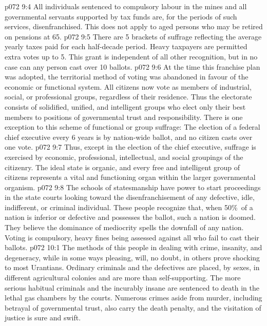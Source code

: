 \vs p072 9:4 \bibnobreakspace All individuals sentenced to compulsory labour in the mines and all governmental servants supported by tax funds are, for the periods of such services, disenfranchised. This does not apply to aged persons who may be retired on pensions at 65.
\vs p072 9:5 \bibnobreakspace There are 5 brackets of suffrage reflecting the average yearly taxes paid for each half\hyp{}decade period. Heavy taxpayers are permitted extra votes up to 5. This grant is independent of all other recognition, but in no case can any person cast over 10 ballots.
\vs p072 9:6 \bibnobreakspace At the time this franchise plan was adopted, the territorial method of voting was abandoned in favour of the economic or functional system. All citizens now vote as members of industrial, social, or professional groups, regardless of their residence. Thus the electorate consists of solidified, unified, and intelligent groups who elect only their best members to positions of governmental trust and responsibility. There is one exception to this scheme of functional or group suffrage: The election of a federal chief executive every 6 years is by nation\hyp{}wide ballot, and no citizen casts over one vote.
\vs p072 9:7 \pc Thus, except in the election of the chief executive, suffrage is exercised by economic, professional, intellectual, and social groupings of the citizenry. The ideal state is organic, and every free and intelligent group of citizens represents a vital and functioning organ within the larger governmental organism.
\vs p072 9:8 The schools of statesmanship have power to start proceedings in the state courts looking toward the disenfranchisement of any defective, idle, indifferent, or criminal individual. These people recognize that, when 50\%\ of a nation is inferior or defective and possesses the ballot, such a nation is doomed. They believe the dominance of mediocrity spells the downfall of any nation. Voting is compulsory, heavy fines being assessed against all who fail to cast their ballots.
\vs p072 10:1 The methods of this people in dealing with crime, insanity, and degeneracy, while in some ways pleasing, will, no doubt, in others prove shocking to most Urantians. Ordinary criminals and the defectives are placed, by sexes, in different agricultural colonies and are more than self\hyp{}supporting. The more serious habitual criminals and the incurably insane are sentenced to death in the lethal gas chambers by the courts. Numerous crimes aside from murder, including betrayal of governmental trust, also carry the death penalty, and the visitation of justice is sure and swift.
